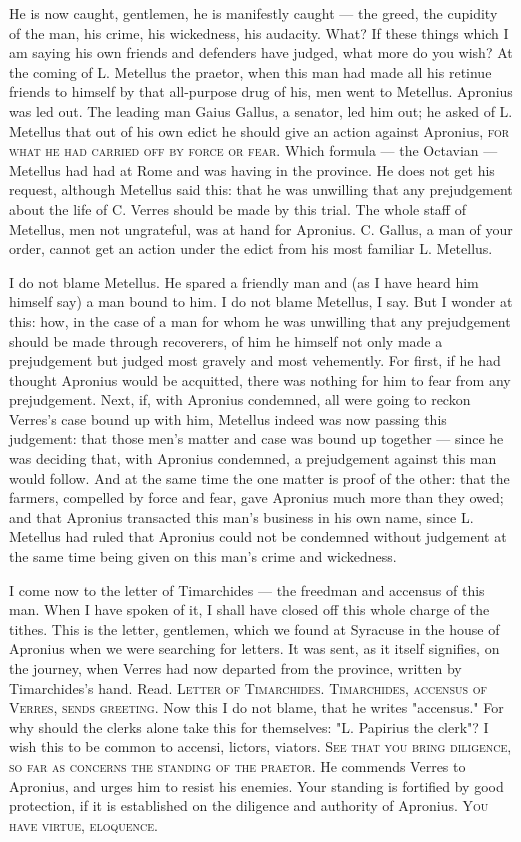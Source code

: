  He is now caught, gentlemen, he is manifestly caught --- the greed, the cupidity of the man, his crime, his wickedness, his audacity. What? If these things which I am saying his own friends and defenders have judged, what more do you wish? At the coming of L. Metellus the praetor, when this man had made all his retinue friends to himself by that all-purpose drug of his, men went to Metellus. Apronius was led out. The leading man Gaius Gallus, a senator, led him out; he asked of L. Metellus that out of his own edict he should give an action against Apronius, \textsc{for what he had carried off by force or fear}. Which formula --- the Octavian --- Metellus had had at Rome and was having in the province. He does not get his request, although Metellus said this: that he was unwilling that any prejudgement about the life of C. Verres should be made by this trial. The whole staff of Metellus, men not ungrateful, was at hand for Apronius. C. Gallus, a man of your order, cannot get an action under the edict from his most familiar L. Metellus.

 I do not blame Metellus. He spared a friendly man and (as I have heard him himself say) a man bound to him. I do not blame Metellus, I say. But I wonder at this: how, in the case of a man for whom he was unwilling that any prejudgement should be made through recoverers, of him he himself not only made a prejudgement but judged most gravely and most vehemently. For first, if he had thought Apronius would be acquitted, there was nothing for him to fear from any prejudgement. Next, if, with Apronius condemned, all were going to reckon Verres's case bound up with him, Metellus indeed was now passing this judgement: that those men's matter and case was bound up together --- since he was deciding that, with Apronius condemned, a prejudgement against this man would follow. And at the same time the one matter is proof of the other: that the farmers, compelled by force and fear, gave Apronius much more than they owed; and that Apronius transacted this man's business in his own name, since L. Metellus had ruled that Apronius could not be condemned without judgement at the same time being given on this man's crime and wickedness.

 I come now to the letter of Timarchides --- the freedman and accensus of this man. When I have spoken of it, I shall have closed off this whole charge of the tithes. This is the letter, gentlemen, which we found at Syracuse in the house of Apronius when we were searching for letters. It was sent, as it itself signifies, on the journey, when Verres had now departed from the province, written by Timarchides's hand. Read. \textsc{Letter of Timarchides. Timarchides, accensus of Verres, sends greeting}. Now this I do not blame, that he writes "accensus." For why should the clerks alone take this for themselves: "L. Papirius the clerk"? I wish this to be common to accensi, lictors, viators. \textsc{See that you bring diligence, so far as concerns the standing of the praetor}. He commends Verres to Apronius, and urges him to resist his enemies. Your standing is fortified by good protection, if it is established on the diligence and authority of Apronius. \textsc{You have virtue, eloquence}.

